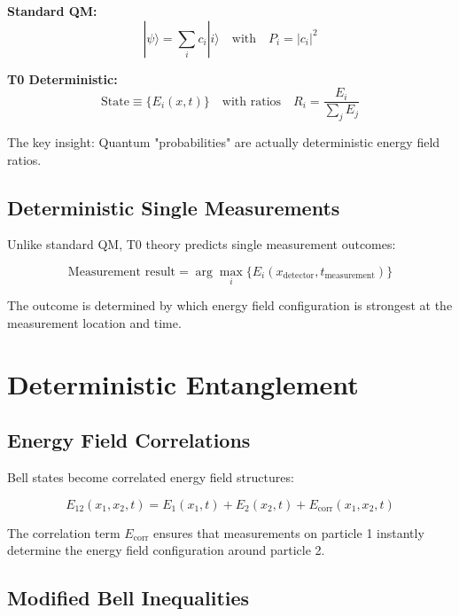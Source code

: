 \documentclass[12pt,a4paper]{report}
\begin{document}
	\textbf{Standard QM:}
	\begin{equation}
		|\psi\rangle = \sum_i c_i |i\rangle \quad \text{with} \quad P_i = |c_i|^2
	\end{equation}
	
	\textbf{T0 Deterministic:}
	\begin{equation}
		\text{State} \equiv \{E_i(x,t)\} \quad \text{with ratios} \quad R_i = \frac{E_i}{\sum_j E_j}
	\end{equation}
	
	The key insight: Quantum "probabilities" are actually deterministic energy field ratios.
	
	\subsection{Deterministic Single Measurements}
	\label{subsec:deterministic_measurements}
	
	Unlike standard QM, T0 theory predicts single measurement outcomes:
	
	\begin{equation}
		\text{Measurement result} = \arg\max_i\{E_i(x_{\text{detector}}, t_{\text{measurement}})\}
	\end{equation}
	
	The outcome is determined by which energy field configuration is strongest at the measurement location and time.
	
	\section{Deterministic Entanglement}
	\label{sec:deterministic_entanglement}
	
	\subsection{Energy Field Correlations}
	\label{subsec:energy_field_correlations}
	
	Bell states become correlated energy field structures:
	
	\begin{equation}
		E_{12}(x_1,x_2,t) = E_1(x_1,t) + E_2(x_2,t) + E_{\text{corr}}(x_1,x_2,t)
	\end{equation}
	
	The correlation term $E_{\text{corr}}$ ensures that measurements on particle 1 instantly determine the energy field configuration around particle 2.
	
	\subsection{Modified Bell Inequalities}
	\label{subsec:modified_bell_inequalities}
	
\end{document}
